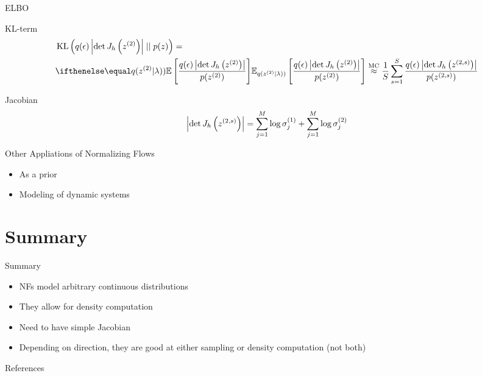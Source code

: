 \documentclass[14pt]{beamer}
\begin{document}
\begin{frame}{ELBO}
\begin{small}
\begin{block}{KL-term}
\begin{equation*}
\begin{aligned}
&\KL{q(\epsilon)\abs{\det\jacob{h}{z^{(2)}}}}{p(z)} = \\
&\E[q(z^{(2)}|\lambda))]{\frac{q(\epsilon)\abs{\det\jacob{h}{z^{(2)}}}}{p(z^{(2)})}} \overset{\text{MC}}{\approx} \frac{1}{S}\sum_{s=1}^{S} \frac{q(\epsilon)\abs{\det\jacob{h}{z^{(2,s)}}}}{p(z^{(2,s)})}
\end{aligned}
\end{equation*}
\end{block}
\begin{block}{Jacobian}
\begin{equation*}
\left|\det J_{h}\left(z^{(2,s)}\right)\right| = \sum_{j=1}^{M}\log\sigma^{(1)}_{j} + \sum_{j=1}^{M}\log\sigma^{(2)}_{j}
\end{equation*}
\end{block}
\end{small}
\end{frame}

\begin{frame}{Other Appliations of Normalizing Flows}
\begin{itemize}
\item As a prior
\item Modeling of dynamic systems
\end{itemize}
\end{frame}

\section{Summary}

\begin{frame}{Summary}
\begin{itemize}
\item NFs model arbitrary continuous distributions
\item They allow for density computation
\item Need to have simple Jacobian
\item Depending on direction, they are good at either sampling or density computation (not both)
\end{itemize}
\end{frame}

\begin{frame}[allowframebreaks]{References}


\end{frame}
\end{document}
